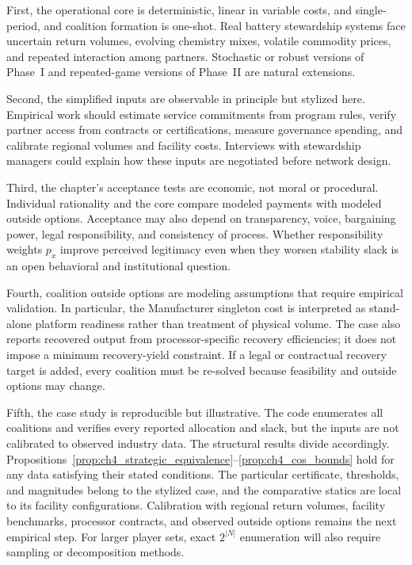 First, the operational core is deterministic, linear in variable costs, and single-period, and coalition formation is one-shot. Real battery stewardship systems face uncertain return volumes, evolving chemistry mixes, volatile commodity prices, and repeated interaction among partners. Stochastic or robust versions of Phase~I and repeated-game versions of Phase~II are natural extensions.

Second, the simplified inputs are observable in principle but stylized here. Empirical work should estimate service commitments from program rules, verify partner access from contracts or certifications, measure governance spending, and calibrate regional volumes and facility costs. Interviews with stewardship managers could explain how these inputs are negotiated before network design.

Third, the chapter's acceptance tests are economic, not moral or procedural. Individual rationality and the core compare modeled payments with modeled outside options. Acceptance may also depend on transparency, voice, bargaining power, legal responsibility, and consistency of process. Whether responsibility weights $p_x$ improve perceived legitimacy even when they worsen stability slack is an open behavioral and institutional question.

Fourth, coalition outside options are modeling assumptions that require empirical validation. In particular, the Manufacturer singleton cost is interpreted as stand-alone platform readiness rather than treatment of physical volume. The case also reports recovered output from processor-specific recovery efficiencies; it does not impose a minimum recovery-yield constraint. If a legal or contractual recovery target is added, every coalition must be re-solved because feasibility and outside options may change.

Fifth, the case study is reproducible but illustrative. The code enumerates all coalitions and verifies every reported allocation and slack, but the inputs are not calibrated to observed industry data. The structural results divide accordingly. Propositions~\ref{prop:ch4_strategic_equivalence}--\ref{prop:ch4_cos_bounds} hold for any data satisfying their stated conditions. The particular certificate, thresholds, and magnitudes belong to the stylized case, and the comparative statics are local to its facility configurations. Calibration with regional return volumes, facility benchmarks, processor contracts, and observed outside options remains the next empirical step. For larger player sets, exact $2^{|N|}$ enumeration will also require sampling or decomposition methods.

